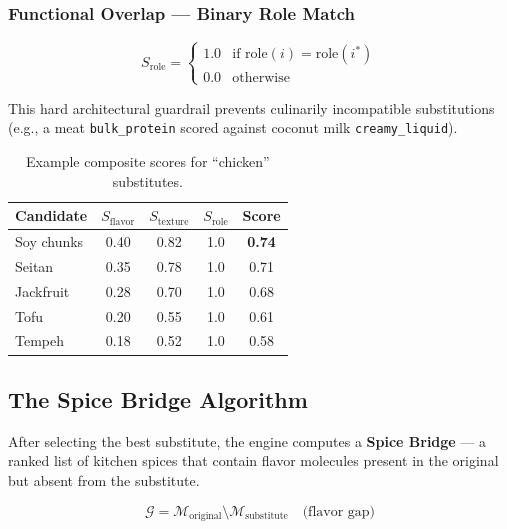 \documentclass[12pt, a4paper]{article}
\begin{document}
\subsubsection{Functional Overlap --- Binary Role Match}

\begin{equation}
S_{\text{role}} =
\begin{cases}
  1.0 & \text{if } \text{role}(i) = \text{role}(i^*) \\
  0.0 & \text{otherwise}
\end{cases}
\label{eq:role}
\end{equation}

This hard architectural guardrail prevents culinarily incompatible substitutions (e.g., a meat
\texttt{bulk\_protein} scored against coconut milk \texttt{creamy\_liquid}).

\begin{table}[H]
\centering
\caption{Example composite scores for ``chicken'' substitutes.}
\label{tab:scores}
\begin{tabular}{l c c c c}
\toprule
\textbf{Candidate} & $S_\text{flavor}$ & $S_\text{texture}$ & $S_\text{role}$ & \textbf{Score} \\
\midrule
Soy chunks  & 0.40 & 0.82 & 1.0 & \textbf{0.74} \\
Seitan      & 0.35 & 0.78 & 1.0 & 0.71 \\
Jackfruit   & 0.28 & 0.70 & 1.0 & 0.68 \\
Tofu        & 0.20 & 0.55 & 1.0 & 0.61 \\
Tempeh      & 0.18 & 0.52 & 1.0 & 0.58 \\
\bottomrule
\end{tabular}
\end{table}

\subsection{The Spice Bridge Algorithm}

After selecting the best substitute, the engine computes a \textbf{Spice Bridge} --- a ranked
list of kitchen spices that contain flavor molecules present in the original but absent from
the substitute.

\begin{equation}
\mathcal{G} = \mathcal{M}_{\text{original}} \setminus \mathcal{M}_{\text{substitute}}
\quad\text{(flavor gap)}
\label{eq:gap}
\end{equation}
\end{document}
